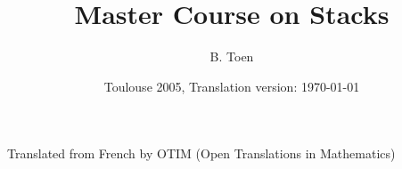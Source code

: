 \documentclass{memoir}
\title{Master Course on Stacks}
\author{B. Toen}
\date{Toulouse 2005, Translation version: \today}
\begin{document}
\maketitle
Translated from French by OTIM (Open Translations in Mathematics)
\tableofcontents{}

\end{document}

